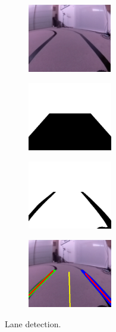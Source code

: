 \documentclass[conference]{IEEEtran}
\begin{document}
\begin{figure}
	\centering
	\begin{subfigure}[c]{0.24\textwidth}
		
		\centerline{\includegraphics[height=3cm]{media/lane_frame}}
		
	\end{subfigure}
	\begin{subfigure}[c]{0.24\textwidth}
		
		\centerline{\includegraphics[height=3cm]{media/stencil}}
		
	\end{subfigure}
	\begin{subfigure}[c]{0.24\textwidth}
		\centerline{\includegraphics[height=3cm]{media/roi_frame}}
	\end{subfigure}
	\begin{subfigure}[c]{0.24\textwidth}
		\centerline{\includegraphics[height=3cm]{media/frame}}
	\end{subfigure}
	\caption{Lane detection.}
	\label{fig:lanedet}
\end{figure}
\end{document}
